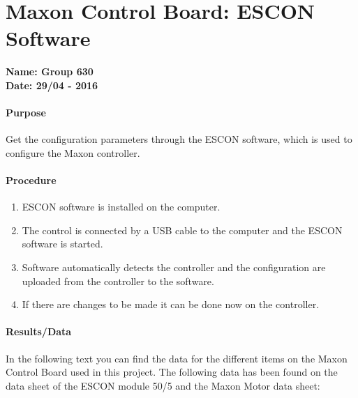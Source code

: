 \chapter{Maxon Control Board: ESCON Software}\label{MaxonControlESCON} 
\textbf{Name: Group 630}\\
\textbf{Date: 29/04 - 2016}

\subsubsection{Purpose}
Get the configuration parameters through the ESCON software, which is used to configure the Maxon controller.  

\subsubsection{Procedure}
\begin{enumerate}
  \item ESCON software is installed on the computer.
  \item The control is connected by a USB cable to the computer and the ESCON software is started.
  \item Software automatically detects the controller and the configuration are uploaded from the controller to the software.
  \item If there are changes to be made it can be done now on the controller.
\end{enumerate}

\subsubsection{Results/Data}
In the following text you can find the data for the different items on the Maxon Control Board used in this project. The following data has been found on the data sheet of the ESCON module 50/5 and the Maxon Motor data sheet:

